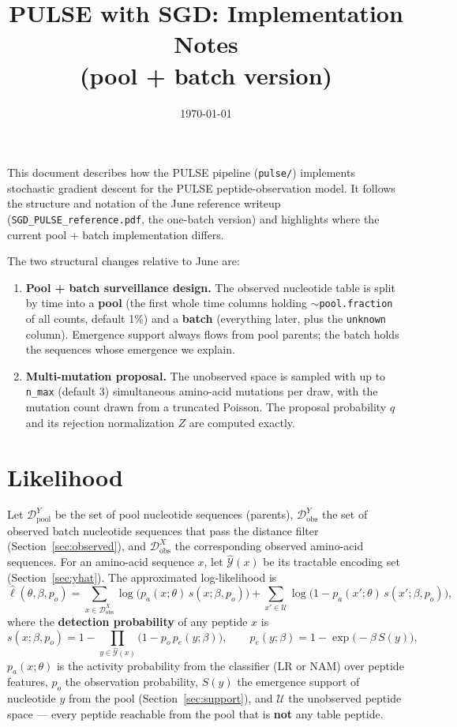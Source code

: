 \documentclass[11pt]{article}
\title{\textbf{PULSE with SGD: Implementation Notes\\ (pool + batch version)}}
\date{\today}
\begin{document}
\maketitle

This document describes how the PULSE pipeline (\texttt{pulse/})
implements stochastic gradient descent for the PULSE peptide-observation
model. It follows the structure and notation of the June reference writeup
(\texttt{SGD\_PULSE\_reference.pdf}, the one-batch version) and highlights
where the current pool + batch implementation differs.

The two structural changes relative to June are:
\begin{enumerate}
\item \textbf{Pool + batch surveillance design.} The observed nucleotide
table is split by time into a \textbf{pool} (the first whole time columns
holding $\sim$\texttt{pool.fraction} of all counts, default 1\%) and a
\textbf{batch} (everything later, plus the \texttt{unknown} column).
Emergence support always flows from pool parents; the batch holds the
sequences whose emergence we explain.
\item \textbf{Multi-mutation proposal.} The unobserved space is sampled
with up to \texttt{n\_max} (default 3) simultaneous amino-acid mutations
per draw, with the mutation count drawn from a truncated Poisson. The
proposal probability $q$ and its rejection normalization $Z$ are computed
exactly.
\end{enumerate}

\section{Likelihood}\label{sec:likelihood}

Let $\mathcal{D}^Y_{\text{pool}}$ be the set of pool nucleotide sequences
(parents), $\mathcal{D}^Y_{\text{obs}}$ the set of observed batch
nucleotide sequences that pass the distance filter
(Section~\ref{sec:observed}), and $\mathcal{D}^X_{\text{obs}}$ the
corresponding observed amino-acid sequences. For an amino-acid sequence
$x$, let $\hat{\mathcal{Y}}(x)$ be its tractable encoding set
(Section~\ref{sec:yhat}). The approximated log-likelihood is
\begin{equation}\label{eq:likelihood}
\hat{\ell}(\theta, \beta, p_o)
= \sum_{x \in \mathcal{D}^X_{\text{obs}}}
\log \Big( p_a(x; \theta) \, s(x; \beta, p_o) \Big)
+ \sum_{x' \in \mathcal{U}}
\log \Big( 1 - p_a(x'; \theta) \, s(x'; \beta, p_o) \Big),
\end{equation}
where the \textbf{detection probability} of any peptide $x$ is
\begin{equation}\label{eq:detection}
s(x; \beta, p_o)
= 1 - \prod_{y \in \hat{\mathcal{Y}}(x)}
\big(1 - p_o \, p_e(y; \beta)\big),
\qquad
p_e(y; \beta) = 1 - \exp\big(-\beta \, S(y)\big),
\end{equation}
$p_a(x;\theta)$ is the activity probability from the classifier (LR or
NAM) over peptide features, $p_o$ the observation probability, $S(y)$ the
emergence support of nucleotide $y$ from the pool
(Section~\ref{sec:support}), and $\mathcal{U}$ the unobserved peptide
space --- every peptide reachable from the pool that is \textbf{not} any
table peptide.
\end{document}
